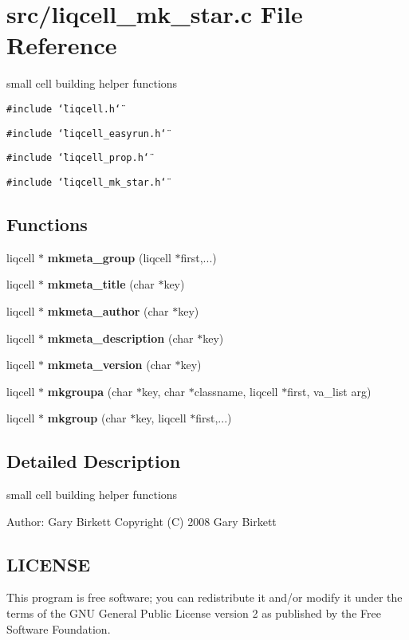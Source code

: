 \section{src/liqcell\_\-mk\_\-star.c File Reference}
\label{d4/d54/liqcell__mk__star_8c}
small cell building helper functions  


{\tt \#include \char`\"{}liqcell.h\char`\"{}}\par
{\tt \#include \char`\"{}liqcell\_\-easyrun.h\char`\"{}}\par
{\tt \#include \char`\"{}liqcell\_\-prop.h\char`\"{}}\par
{\tt \#include \char`\"{}liqcell\_\-mk\_\-star.h\char`\"{}}\par
\subsection*{Functions}
\begin{CompactItemize}
\item 
liqcell $\ast$ {\bf mkmeta\_\-group} (liqcell $\ast$first,...)
\item 
liqcell $\ast$ {\bf mkmeta\_\-title} (char $\ast$key)
\item 
liqcell $\ast$ {\bf mkmeta\_\-author} (char $\ast$key)
\item 
liqcell $\ast$ {\bf mkmeta\_\-description} (char $\ast$key)
\item 
liqcell $\ast$ {\bf mkmeta\_\-version} (char $\ast$key)
\item 
liqcell $\ast$ {\bf mkgroupa} (char $\ast$key, char $\ast$classname, liqcell $\ast$first, va\_\-list arg)
\item 
liqcell $\ast$ {\bf mkgroup} (char $\ast$key, liqcell $\ast$first,...)
\end{CompactItemize}


\label{_details}
\subsection{Detailed Description}
small cell building helper functions 

\begin{Desc}
\item[Author:]Gary Birkett Copyright (C) 2008 Gary Birkett\end{Desc}
\subsection{LICENSE}\label{de/d77/liqui_8c_LICENSE}
This program is free software; you can redistribute it and/or modify it under the terms of the GNU General Public License version 2 as published by the Free Software Foundation.

